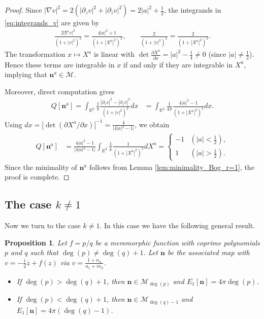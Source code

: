 \documentclass{amsart}
\numberwithin{equation}{section}
\newtheorem{proposition}[theorem]{Proposition}
\theoremstyle{definition}
\theoremstyle{remark}
\newcommand{\R}{\mathbb{R}}
\newcommand{\boM}{\mathcal{M}}
\newcommand{\ovl}[1]{\overline{#1}}					%
\newcommand{\rd}{{\partial}}								%
\newcommand{\nab}{{\nabla}}							%
\newcommand{\bn}{{\mathbf{n}}}
\begin{document}
\begin{proof}
Since 
$|\nab v|^2 = 2(|\rd_z v|^2+ |\rd_{\ovl z} v|^2)=2|a|^2 + \frac 12$, 
the integrands in \eqref{eq:integrands_v} are given by
\begin{align*}
\frac{2|\nab v|^2}{(1+|v|^2)^2} 
= \frac{4|a|^2+1}{(1+|X^a|^2)^2}, \qquad \frac{2}{(1+|v|^2)^2}
=
 \frac{2}{(1+|X^a|^2)^2}.
\end{align*}
The transformation $x\mapsto X^a$ is linear with $\det\frac{\rd X^a}{\rd x}=|a|^2-\frac{1}{4}\neq0$ (since $|a|\neq\tfrac12$).
Hence these terms are integrable in $x$ if and only if they are integrable in $X^a$, implying that $\bn^a\in\boM$.

Moreover, direct computation gives 
\begin{align*}
Q[\bn^a]
=
\int_{\R^2} \frac{1}{\pi} 
\frac{|\rd_z v|^2 - |\rd_{\ovl z}v|^2}{(1+|v|^2)^2}dx
&=
\int_{\R^2} \frac{1}{4\pi}\frac{4|a|^2-1}{(1+|X^a|^2)^2}dx.
\end{align*}
Using $dx=|\det(\rd X^a/\rd x)|^{-1}
=\frac{4}{|4|a|^2-1|}$, we obtain
\begin{align*}
Q[\bn^a]
&=
\frac{4|a|^2-1}{|4|a|^2-1|}
\int_{\R^2}\frac{1}{\pi}\frac{1}{(1+|X^a|^2)^2}dX^a
=
\begin{cases}
    -1 & (|a|<\frac12),\\
    1 & (|a|>\frac12).
\end{cases}
\end{align*}
Since the minimality of $\bn^a$ follows from Lemma \ref{lem:minimality_Bog_r=1}, the proof is complete.
\end{proof}

\subsection{The case \texorpdfstring{$k\neq1$}{k≠1}}

Now we turn to the case $k\neq1$.
In this case we have the following general result.

\begin{proposition}
    Let $f=p/q$ be a meromorphic function with coprime polynomials $p$ and $q$ such that $\deg(p)\neq\deg(q)+1$.
    Let $\bn$ be the associated map with $v=-\frac{i}{2}\ovl{z}+f(z)$ via $v=\frac{1+n_3}{n_1+in_2}$.
    \begin{itemize}
        \item If $\deg(p)>\deg(q)+1$, then $\bn\in\boM_{\deg(p)}$ and $E_1[\bn]=4\pi\deg(p)$.
        \item If $\deg(p)<\deg(q)+1$, then $\bn\in\boM_{\deg(q)-1}$ and $E_1[\bn]=4\pi(\deg(q)-1)$.
    \end{itemize}
\end{proposition}
\end{document}
